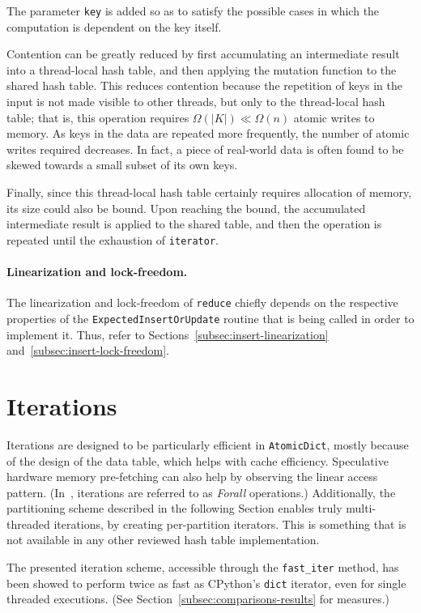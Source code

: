 The parameter \texttt{key} is added so as to satisfy the possible cases in which the computation is dependent on the key itself.

Contention can be greatly reduced by first accumulating an intermediate result into a thread-local hash table, and then applying the mutation function to the shared hash table.
This reduces contention because the repetition of keys in the input is not made visible to other threads, but only to the thread-local hash table; that is, this operation requires $\Omega(|K|) \ll \Omega(n)$ atomic writes to memory.
As keys in the data are repeated more frequently, the number of atomic writes required decreases.
In fact, a piece of real-world data is often found to be skewed towards a small subset of its own keys.

Finally, since this thread-local hash table certainly requires allocation of memory, its size could also be bound.
Upon reaching the bound, the accumulated intermediate result is applied to the shared table, and then the operation is repeated until the exhaustion of \texttt{iterator}.

\paragraph{Linearization and lock-freedom.}
The linearization and lock-freedom of \texttt{reduce} chiefly depends on the respective properties of the \texttt{ExpectedInsertOrUpdate} routine that is being called in order to implement it.
Thus, refer to Sections~\ref{subsec:insert-linearization} and~\ref{subsec:insert-lock-freedom}.


\section{Iterations}\label{sec:iterations}

Iterations are designed to be particularly efficient in \texttt{AtomicDict}, mostly because of the design of the data table, which helps with cache efficiency.
Speculative hardware memory pre-fetching can also help by observing the linear access pattern.
(In~\cite{maier}, iterations are referred to as \emph{Forall} operations.)
Additionally, the partitioning scheme described in the following Section enables truly multi-threaded iterations, by creating per-partition iterators.
This is something that is not available in any other reviewed hash table implementation.

The presented iteration scheme, accessible through the \texttt{{fast\_iter}} method, has been showed to perform twice as fast as CPython's \texttt{dict} iterator, even for single threaded executions.
(See Section~\ref{subsec:comparisons-results} for measures.)

